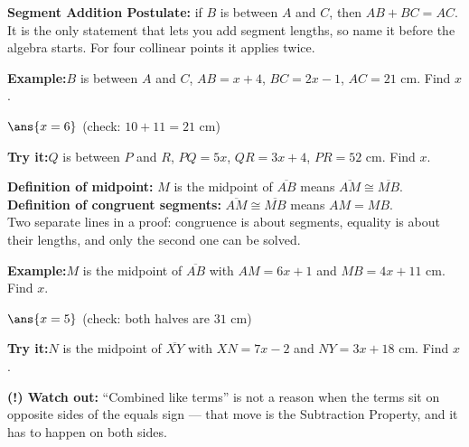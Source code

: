 \documentclass[12pt]{article}
\begin{document}
\begin{formulabox}
\textbf{Segment Addition Postulate:} if $B$ is between $A$ and $C$, then
$AB + BC = AC$. It is the only statement that lets you add segment lengths, so
name it before the algebra starts. For four collinear points it applies twice.
\end{formulabox}
\begin{examplebox}
\textbf{Example:}\quad $B$ is between $A$ and $C$, $AB = x + 4$,
$BC = 2x - 1$, $AC = 21$ cm. Find $x$.
\par
$\ans{x = 6}$ \quad (check: $10 + 11 = 21$ cm)
\end{examplebox}
\begin{tryitbox}
\textbf{Try it:}\quad $Q$ is between $P$ and $R$, $PQ = 5x$, $QR = 3x + 4$,
$PR = 52$ cm. Find $x$.\\[2pt]
\end{tryitbox}

\begin{formulabox}
\textbf{Definition of midpoint:} $M$ is the midpoint of $\overline{AB}$ means
$\overline{AM} \cong \overline{MB}$.\\[3pt]
\textbf{Definition of congruent segments:} $\overline{AM} \cong \overline{MB}$
means $AM = MB$.\\[3pt]
Two separate lines in a proof: congruence is about segments, equality is about
their lengths, and only the second one can be solved.
\end{formulabox}
\begin{examplebox}
\textbf{Example:}\quad $M$ is the midpoint of $\overline{AB}$ with
$AM = 6x + 1$ and $MB = 4x + 11$ cm. Find $x$.
\par
$\ans{x = 5}$ \quad (check: both halves are $31$ cm)
\end{examplebox}
\begin{tryitbox}
\textbf{Try it:}\quad $N$ is the midpoint of $\overline{XY}$ with
$XN = 7x - 2$ and $NY = 3x + 18$ cm. Find $x$.\\[2pt]
\end{tryitbox}

\begin{watchoutbox}
\textbf{(!) Watch out:} ``Combined like terms'' is not a reason when the terms
sit on opposite sides of the equals sign --- that move is the Subtraction
Property, and it has to happen on both sides.
\end{watchoutbox}
\end{document}
